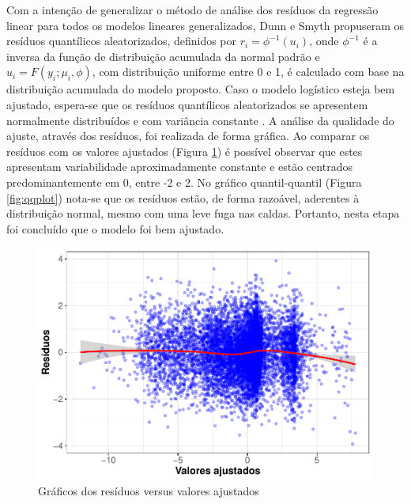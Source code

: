 \documentclass[twocolumn]{rbef}
\newcommand{\1}{\mathbbm{1}}
\begin{document}
Com a intenção de generalizar o método de análise dos resíduos da regressão linear para todos os modelos lineares generalizados, Dunn e Smyth \cite{Dunn1996} propuseram os resíduos quantílicos aleatorizados, definidos por \(r_i = \phi^{-1}(u_i)\), onde \(\phi^{-1}\) é a inversa da função de distribuição acumulada da normal padrão e \(u_i = F(y_i;\mu_i,\phi)\), com distribuição uniforme entre 0 e 1, é calculado com base na distribuição acumulada do modelo proposto. Caso o modelo logístico esteja bem ajustado, espera-se que os resíduos quantílicos aleatorizados se apresentem normalmente distribuídos e com variância constante \cite{Taconeli2015}. A análise da qualidade do ajuste, através dos resíduos, foi realizada de forma gráfica. Ao comparar os resíduos com os valores ajustados (Figura \ref{fig:resplot}) é possível observar que estes apresentam variabilidade aproximadamente constante e estão centrados predominantemente em 0, entre -2 e 2. No gráfico quantil-quantil \cite{Wilk1968} (Figura \ref{fig:qqplot}) nota-se que os resíduos estão, de forma razoável, aderentes à distribuição normal, mesmo com uma leve fuga nas caldas. Portanto, nesta etapa foi concluído que o modelo foi bem ajustado.

\begin{figure}

{\centering \includegraphics[width=1\linewidth]{article_files/figure-latex/resplot-1} 

}

\caption{Gráficos dos resíduos versus valores ajustados}\label{fig:resplot}
\end{figure}
\end{document}
